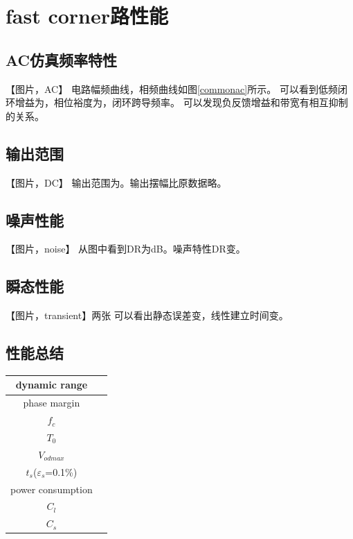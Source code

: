 \documentclass[a4paper]{article}
\begin{document}
\newpage
\clearpage

\section{fast corner路性能}
\subsection{AC仿真频率特性}
【图片，AC】
电路幅频曲线，相频曲线如图\ref{commonac}所示。
可以看到低频闭环增益为，相位裕度为，闭环跨导频率。
可以发现负反馈增益和带宽有相互抑制的关系。
\newpage
\clearpage
\subsection{输出范围}
【图片，DC】
输出范围为。输出摆幅比原数据略。
\newpage
\clearpage
\subsection{噪声性能}
【图片，noise】
从图中看到DR为dB。噪声特性DR变。
\newpage
\clearpage
\subsection{瞬态性能}
【图片，transient】两张
可以看出静态误差变，线性建立时间变。
\newpage
\clearpage
\subsection{性能总结}
\begin{table}[htbp]
    \begin{tabular}{|c|c|}
        \hline
        dynamic range&\\
        \hline
        phase margin&\\
        \hline
        $f_c$ &\\
        \hline 
        $T_0$&\\
        \hline
        $V_{odmax}$&\\
        \hline
        $t_s$($\varepsilon_s$=0.1\%)&\\
        \hline
        power consumption&\\
        \hline
        $C_l$&\\
        \hline
        $C_s$&\\
        \hline
    \end{tabular}
\end{table}
\end{document}

